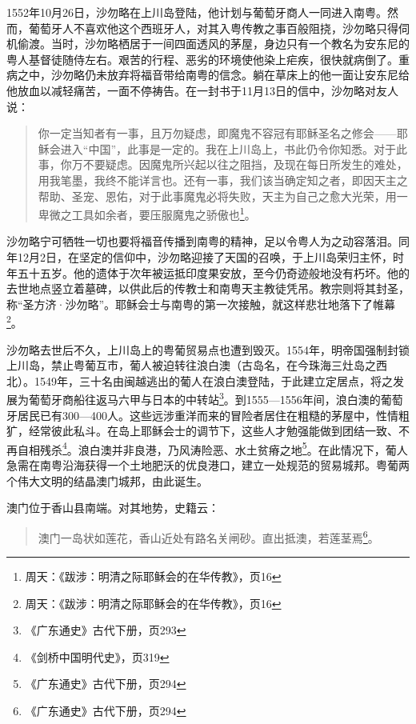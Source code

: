 1552年10月26日，沙勿略在上川岛登陆，他计划与葡萄牙商人一同进入南粤。然而，葡萄牙人不喜欢他这个西班牙人，对其入粤传教之事百般阻挠，沙勿略只得伺机偷渡。当时，沙勿略栖居于一间四面透风的茅屋，身边只有一个教名为安东尼的粤人基督徒随侍左右。艰苦的行程、恶劣的环境使他染上疟疾，很快就病倒了。重病之中，沙勿略仍未放弃将福音带给南粤的信念。躺在草床上的他一面让安东尼给他放血以减轻痛苦，一面不停祷告。在一封书于11月13日的信中，沙勿略对友人说：

\begin{quote}

你一定当知者有一事，且万勿疑虑，即魔鬼不容冠有耶稣圣名之修会——耶稣会进入“中国”，此事是一定的。我在上川岛上，书此仍令你知悉。对于此事，你万不要疑虑。因魔鬼所兴起以往之阻挡，及现在每日所发生的难处，用我笔墨，我终不能详言也。还有一事，我们该当确定知之者，即因天主之帮助、圣宠、恩佑，对于此事魔鬼必将失败，天主为自己之愈大光荣，用一卑微之工具如余者，要压服魔鬼之骄傲也\footnote{周天：《跋涉：明清之际耶稣会的在华传教》，页16}。

\end{quote}

沙勿略宁可牺牲一切也要将福音传播到南粤的精神，足以令粤人为之动容落泪。同年12月2日，在坚定的信仰中，沙勿略迎接了天国的召唤，于上川岛荣归主怀，时年五十五岁。他的遗体于次年被运抵印度果安放，至今仍奇迹般地没有朽坏。他的去世地点竖立着墓碑，以供此后的传教士和南粤天主教徒凭吊。教宗则将其封圣，称“圣方济·沙勿略”。耶稣会士与南粤的第一次接触，就这样悲壮地落下了帷幕\footnote{周天：《跋涉：明清之际耶稣会的在华传教》，页16}。

沙勿略去世后不久，上川岛上的粤葡贸易点也遭到毁灭。1554年，明帝国强制封锁上川岛，禁止粤葡互市，葡人被迫转往浪白澳（古岛名，在今珠海三灶岛之西北）。1549年，三十名由闽越逃出的葡人在浪白澳登陆，于此建立定居点，将之发展为葡萄牙商船往返马六甲与日本的中转站\footnote{《广东通史》古代下册，页293}。到1555—1556年间，浪白澳的葡萄牙居民已有300—400人。这些远涉重洋而来的冒险者居住在粗糙的茅屋中，性情粗犷，经常彼此私斗。在岛上耶稣会士的调节下，这些人才勉强能做到团结一致、不再自相残杀\footnote{《剑桥中国明代史》，页319}。浪白澳并非良港，乃风涛险恶、水土贫瘠之地\footnote{《广东通史》古代下册，页294}。在此情况下，葡人急需在南粤沿海获得一个土地肥沃的优良港口，建立一处规范的贸易城邦。粤葡两个伟大文明的结晶澳门城邦，由此诞生。

澳门位于香山县南端。对其地势，史籍云：

\begin{quote}

澳门一岛状如莲花，香山近处有路名关闸砂。直出抵澳，若莲茎焉\footnote{《广东通史》古代下册，页294}。

\end{quote}

